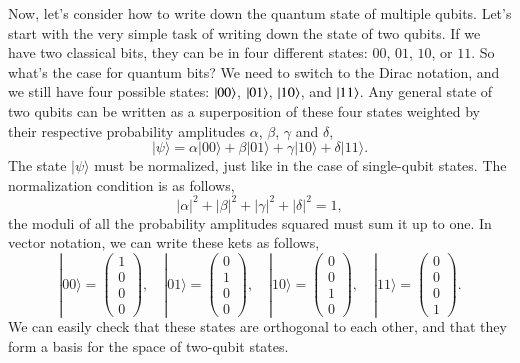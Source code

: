 Now, let's consider how to write down the quantum state of multiple qubits. Let's start with the very simple task of writing down the state of two qubits. If we have two classical bits, they can be in four different states: $00$, $01$, $10$, or $11$. So what's the case for quantum bits? We need to switch to the Dirac notation, and we still have four possible states: $\left| 00 \right\rangle$, $\left| 01 \right\rangle$, $\left| 10 \right\rangle$, and $\left| 11 \right\rangle$. Any general state of two qubits can be written as a superposition of these four states weighted by their respective probability amplitudes $\alpha$, $\beta$, $\gamma$ and $\delta$, 
\begin{equation}
    |\psi\rangle=\alpha|00\rangle+\beta|01\rangle+\gamma|10\rangle+\delta|11\rangle.
    \label{eq:superposition_2qubits}
\end{equation}
The state $|\psi\rangle$ must be normalized, just like in the case of single-qubit states. The normalization condition is as follows,
\begin{equation}
    |\alpha|^2+|\beta|^2+|\gamma|^2+|\delta|^2 = 1,
\end{equation}
the moduli of all the probability amplitudes squared must sum it up to one.
In vector notation, we can write these kets as follows,
\begin{equation}
|00\rangle=\left(\begin{array}{l}
1 \\
0 \\
0 \\
0
\end{array}\right), \quad |01\rangle=\left(\begin{array}{l}
0 \\
1 \\
0 \\
0
\end{array}\right), \quad |10\rangle=\left(\begin{array}{l}
0 \\
0 \\
1 \\
0
\end{array}\right), \quad |11\rangle=\left(\begin{array}{l}
0 \\
0 \\
0 \\
1
\end{array}\right).
\end{equation}
We can easily check that these states are orthogonal to each other, and that they form a basis for the space of two-qubit states.
